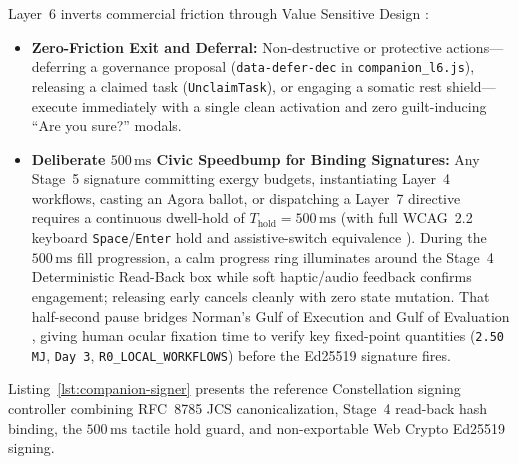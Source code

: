 Layer~6 inverts commercial friction through Value Sensitive Design \parencite{friedman2019vsd}:
\begin{itemize}
  \item \textbf{Zero-Friction Exit and Deferral:} Non-destructive or protective actions---deferring a governance proposal (\texttt{data-defer-dec} in \texttt{companion\_l6.js}), releasing a claimed task (\texttt{UnclaimTask}), or engaging a somatic rest shield---execute immediately with a single clean activation and zero guilt-inducing ``Are you sure?'' modals.
  \item \textbf{Deliberate $500\,\mathrm{ms}$ Civic Speedbump for Binding Signatures:} Any Stage~5 signature committing exergy budgets, instantiating Layer~4 workflows, casting an Agora ballot, or dispatching a Layer~7 directive requires a continuous dwell-hold of $T_{\mathrm{hold}} = 500\,\mathrm{ms}$ (with full WCAG~2.2 keyboard \texttt{Space}/\texttt{Enter} hold and assistive-switch equivalence \parencite{w3c2023wcag}). During the $500\,\mathrm{ms}$ fill progression, a calm progress ring illuminates around the Stage~4 Deterministic Read-Back box while soft haptic/audio feedback confirms engagement; releasing early cancels cleanly with zero state mutation. That half-second pause bridges Norman's Gulf of Execution and Gulf of Evaluation \parencite{norman2013design}, giving human ocular fixation time to verify key fixed-point quantities (\texttt{2.50 MJ}, \texttt{Day 3}, \texttt{R0\_LOCAL\_WORKFLOWS}) before the Ed25519 signature fires.
\end{itemize}

Listing~\ref{lst:companion-signer} presents the reference Constellation signing controller combining RFC~8785 JCS canonicalization, Stage~4 read-back hash binding, the $500\,\mathrm{ms}$ tactile hold guard, and non-exportable Web Crypto Ed25519 signing.

